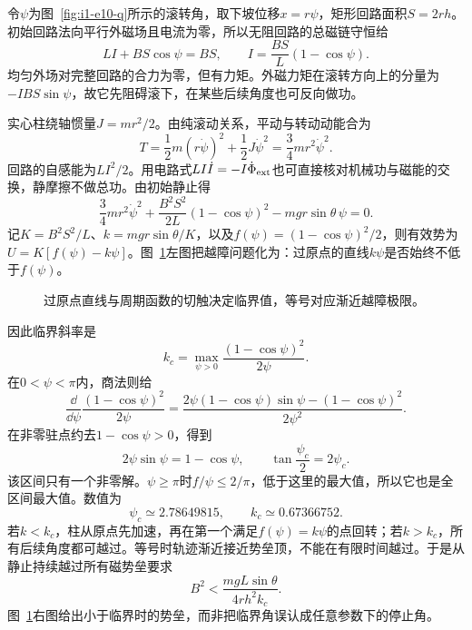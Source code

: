 \begin{solution}
令$\psi$为图~\ref{fig:i1-e10-q}所示的滚转角，取下坡位移$x=r\psi$，矩形回路面积$S=2rh$。初始回路法向平行外磁场且电流为零，所以无阻回路的总磁链守恒给
\[LI+BS\cos\psi=BS,\qquad
\boxed{I=\frac{BS}{L}(1-\cos\psi)}.
\]
均匀外场对完整回路的合力为零，但有力矩。外磁力矩在滚转方向上的分量为$-IBS\sin\psi$，故它先阻碍滚下，在某些后续角度也可反向做功。

实心柱绕轴惯量$J=mr^2/2$。由纯滚动关系，平动与转动动能合为
\[T=\frac12m(r\dot\psi)^2+\frac12J\dot\psi^2
=\frac34mr^2\dot\psi^2.
\]
回路的自感能为$LI^2/2$。用电路式$LI\dot I=-I\dot\Phi_{\rm ext}$也可直接核对机械功与磁能的交换，静摩擦不做总功。由初始静止得
\[\frac34mr^2\dot\psi^2+
\frac{B^2S^2}{2L}(1-\cos\psi)^2-mgr\sin\theta\,\psi=0.
\]
记$K=B^2S^2/L$、$k=mgr\sin\theta/K$，以及$f(\psi)=(1-\cos\psi)^2/2$，则有效势为$U=K[f(\psi)-k\psi]$。图~\ref{fig:i1-e10-s}左图把越障问题化为：过原点的直线$k\psi$是否始终不低于$f(\psi)$。


\begin{figure}[H]\centering
{}
\caption{过原点直线与周期函数的切触决定临界值，等号对应渐近越障极限。}\label{fig:i1-e10-s}
\end{figure}

因此临界斜率是
\[k_c=\max_{\psi>0}\frac{(1-\cos\psi)^2}{2\psi}.
\]
在$0<\psi<\pi$内，商法则给
\[\frac{\dd}{\dd\psi}\frac{(1-\cos\psi)^2}{2\psi}
=\frac{2\psi(1-\cos\psi)\sin\psi-(1-\cos\psi)^2}{2\psi^2}.\]
在非零驻点约去$1-\cos\psi>0$，得到
\[2\psi\sin\psi=1-\cos\psi,
\qquad\boxed{\tan\frac{\psi_c}{2}=2\psi_c}.
\]
该区间只有一个非零解。$\psi\ge\pi$时$f/\psi\le2/\pi$，低于这里的最大值，所以它也是全区间最大值。数值为
\[\psi_c\simeq2.78649815,\qquad k_c\simeq0.67366752.
\]
若$k<k_c$，柱从原点先加速，再在第一个满足$f(\psi)=k\psi$的点回转；若$k>k_c$，所有后续角度都可越过。等号时轨迹渐近接近势垒顶，不能在有限时间越过。于是从静止持续越过所有磁势垒要求
\[\boxed{B^2<\frac{mgL\sin\theta}{4rh^2k_c}}.
\]
图~\ref{fig:i1-e10-s}右图给出小于临界时的势垒，而非把临界角误认成任意参数下的停止角。


\end{solution}
